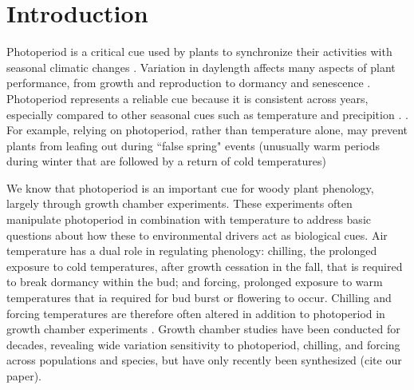 \documentclass{article}
\begin{document}
\section*{Introduction}
\par Photoperiod is a critical cue used by plants to synchronize their activities with seasonal climatic changes \citep[e.g.,][]{Hsu:2011,Singh:2017,Basler:2012}. Variation in daylength affects many aspects of plant performance, from growth and reproduction to dormancy and senescence \citep[e.g.,][]{Howe:1996,lagercrantz2009}.  Photoperiod represents a reliable cue because it is consistent across years, especially compared to other seasonal cues such as temperature and precipition \citep{saikkonen2012}. 
. For example, relying on photoperiod, rather than temperature alone, may prevent plants from leafing out during ``false spring" events (unusually warm periods during winter that are followed by a return of cold temperatures) %
\par We know that photoperiod is an important cue for woody plant phenology, largely through growth chamber experiments.  These experiments often manipulate photoperiod in combination with temperature to address basic questions about how these to environmental drivers act as biological cues. Air temperature has a dual role in regulating phenology: chilling, the prolonged exposure to cold temperatures, after growth cessation in the fall, that is required to break dormancy within the bud; and forcing, prolonged exposure to warm temperatures that ia required for bud burst or flowering to occur. Chilling and forcing temperatures are therefore often altered in addition to photoperiod in growth chamber experiments \citep[e.g.,][]{Campbell:1975aa,HEIDE:1977aa,Falusi:1990aa,Spann:2004aa,Laube:2014a}. Growth chamber studies have been conducted for decades, revealing wide variation sensitivity to photoperiod, chilling, and forcing across populations and species, but have only recently been synthesized (cite our paper).
 
\end{document}
